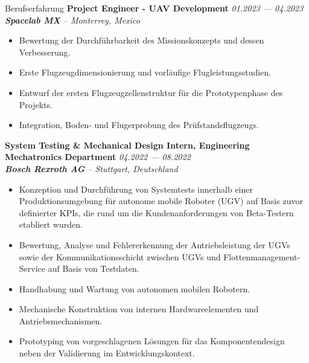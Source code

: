 \documentclass[a4paper]{resume} %
\begin{document}
\begin{rSection}{Berufserfahrung}
        {\bf Project Engineer - UAV Development} \hfill{\itshape 01.2023 --- 04.2023} 
        \\{\textit{\textbf{Spacelab MX} -- Monterrey, Mexico}}
        \begin{itemize}
            \item Bewertung der Durchführbarkeit des Missionskonzepts und dessen Verbesserung.
            \item Erste Flugzeugdimensionierung und vorläufige Flugleistungsstudien.
            \item Entwurf der ersten Flugzeugzellenstruktur für die Prototypenphase des Projekts.
            \item Integration, Boden- und Flugerprobung des Prüfstandsflugzeugs.
        \end{itemize}
    
        {\bf System Testing \& Mechanical Design Intern, Engineering Mechatronics Department} \hfill{\itshape 04.2022 --- 08.2022} 
        \\{\textit{\textbf{Bosch Rexroth AG} -- Stuttgart, Deutschland}}
        \begin{itemize}
            \item Konzeption und Durchführung von Systemtests innerhalb einer Produktionsumgebung für autonome mobile Roboter (UGV) auf Basis zuvor definierter KPIs, die rund um die Kundenanforderungen von Beta-Testern etabliert wurden.
            \item Bewertung, Analyse und Fehlererkennung der Antriebsleistung der UGVs sowie der Kommunikationsschicht zwischen UGVs und Flottenmanagement-Service auf Basis von Testdaten.
            \item Handhabung und Wartung von autonomen mobilen Robotern.
            \item Mechanische Konstruktion von internen Hardwareelementen und Antriebsmechanismen.
            \item Prototyping von vorgeschlagenen Lösungen für das Komponentendesign neben der Validierung im Entwicklungskontext.
        \end{itemize}
    \end{rSection}
\end{document}

